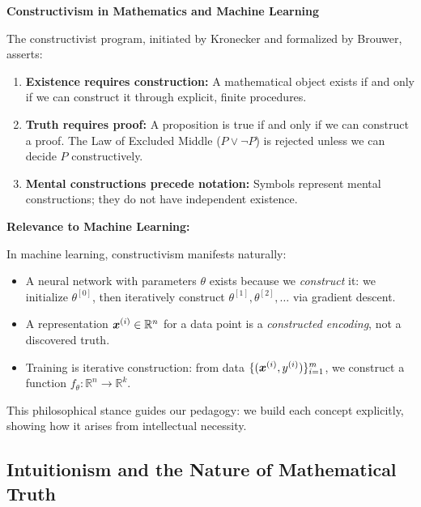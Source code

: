 \begin{philobox}
    \textbf{Constructivism in Mathematics and Machine Learning}

    The constructivist program, initiated by Kronecker and formalized by Brouwer,
    asserts:

    \begin{enumerate}
        \item \textbf{Existence requires construction:} A mathematical object exists if and only if we can construct it through explicit, finite procedures.

        \item \textbf{Truth requires proof:} A proposition is true if and only if we can construct a proof. The Law of Excluded Middle ($P \vee \neg P$) is rejected unless we can decide $P$ constructively.

        \item \textbf{Mental constructions precede notation:} Symbols represent mental constructions; they do not have independent existence.
    \end{enumerate}

    \textbf{Relevance to Machine Learning:}

    In machine learning, constructivism manifests naturally:
    \begin{itemize}
        \item A neural network with parameters $\theta$ exists because we \textit{construct}
              it: we initialize $\theta^{[0]}$, then iteratively construct $\theta^{[1]},
                  \theta^{[2]}, \ldots$ via gradient descent.
        \item A representation $\bm{x}^{(i)} \in \mathbb{R}^n$ for a data point is a
              \textit{constructed encoding}, not a discovered truth.
        \item Training is iterative construction: from data $\{(\bm{x}^{(i)},
                  y^{(i)})\}_{i=1}^m$, we construct a function $f_\theta: \mathbb{R}^n \to
                  \mathbb{R}^k$.
    \end{itemize}

    This philosophical stance guides our pedagogy: we build each concept
    explicitly, showing how it arises from intellectual necessity.
\end{philobox}

\subsection{Intuitionism and the Nature of Mathematical Truth}

